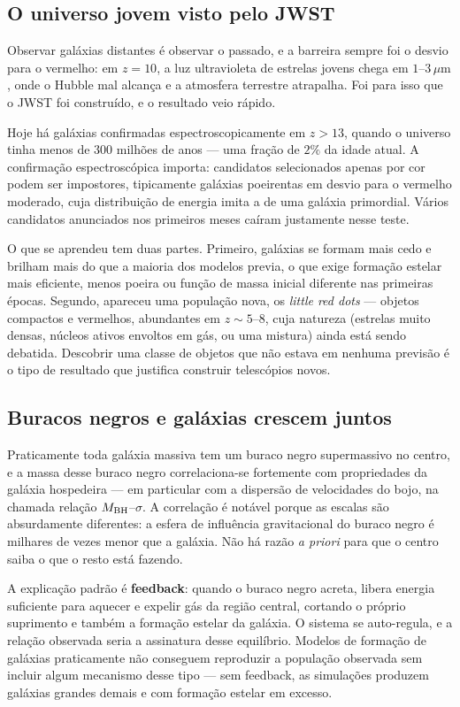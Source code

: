 \documentclass[11pt,a4paper]{article}
\begin{document}
\subsection*{O universo jovem visto pelo JWST}

Observar galáxias distantes é observar o passado, e a barreira sempre foi o desvio para o vermelho: em $z=10$, a luz ultravioleta de estrelas jovens chega em $1$--$3\,\mu\mathrm{m}$, onde o Hubble mal alcança e a atmosfera terrestre atrapalha. Foi para isso que o JWST foi construído, e o resultado veio rápido.

Hoje há galáxias confirmadas espectroscopicamente em $z>13$, quando o universo tinha menos de $300$ milhões de anos --- uma fração de $2\%$ da idade atual. A confirmação espectroscópica importa: candidatos selecionados apenas por cor podem ser impostores, tipicamente galáxias poeirentas em desvio para o vermelho moderado, cuja distribuição de energia imita a de uma galáxia primordial. Vários candidatos anunciados nos primeiros meses caíram justamente nesse teste.

O que se aprendeu tem duas partes. Primeiro, galáxias se formam mais cedo e brilham mais do que a maioria dos modelos previa, o que exige formação estelar mais eficiente, menos poeira ou função de massa inicial diferente nas primeiras épocas. Segundo, apareceu uma população nova, os \textit{little red dots} --- objetos compactos e vermelhos, abundantes em $z\sim5$--$8$, cuja natureza (estrelas muito densas, núcleos ativos envoltos em gás, ou uma mistura) ainda está sendo debatida. Descobrir uma classe de objetos que não estava em nenhuma previsão é o tipo de resultado que justifica construir telescópios novos.

\subsection*{Buracos negros e galáxias crescem juntos}

Praticamente toda galáxia massiva tem um buraco negro supermassivo no centro, e a massa desse buraco negro correlaciona-se fortemente com propriedades da galáxia hospedeira --- em particular com a dispersão de velocidades do bojo, na chamada relação $M_{\rm BH}$--$\sigma$. A correlação é notável porque as escalas são absurdamente diferentes: a esfera de influência gravitacional do buraco negro é milhares de vezes menor que a galáxia. Não há razão \emph{a priori} para que o centro saiba o que o resto está fazendo.

A explicação padrão é \textbf{feedback}: quando o buraco negro acreta, libera energia suficiente para aquecer e expelir gás da região central, cortando o próprio suprimento e também a formação estelar da galáxia. O sistema se auto-regula, e a relação observada seria a assinatura desse equilíbrio. Modelos de formação de galáxias praticamente não conseguem reproduzir a população observada sem incluir algum mecanismo desse tipo --- sem feedback, as simulações produzem galáxias grandes demais e com formação estelar em excesso.
\end{document}
